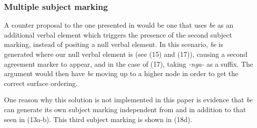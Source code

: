 \documentclass[output=paper]{langsci/langscibook}
\newcommand{\nga}[0]{\textit {-nga- }}
\newcommand{\bee}[0]{\textit {be }}
\begin{document}
% 
% 
% 



\subsubsection{Multiple subject marking}

A counter proposal to the one presented in  would be one that uses \bee as an additional verbal element which triggers the presence of the second subject marking, instead of positing a null verbal element. In this scenario, \bee is generated where our null verbal element is (see (15) and (17)), causing a second agreement marker to appear, and in the case of (17), taking \nga as a suffix. The argument would then have \bee moving up to a higher node in order to get the correct surface ordering.

One reason why this solution is not implemented in this paper is evidence that \bee can generate its own subject marking independent from and in addition to that seen in  (13a-b). This third subject marking is shown in (18d).
\end{document}
